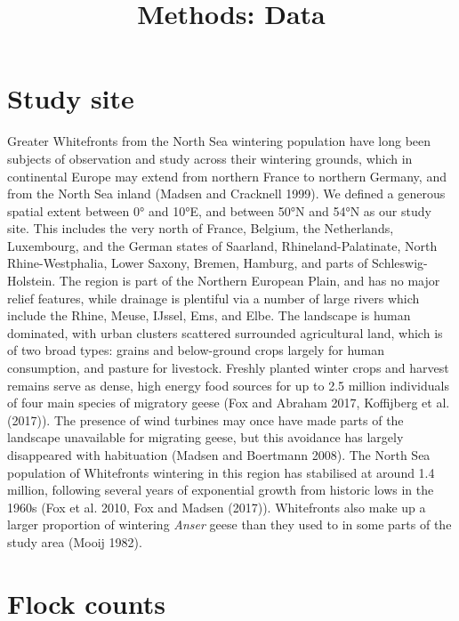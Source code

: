 \documentclass[twocolumn]{article}
\title{Methods: Data}
\date{}
\begin{document}
\maketitle

\section{Study site}\label{study-site}

Greater Whitefronts from the North Sea wintering population have long
been subjects of observation and study across their wintering grounds,
which in continental Europe may extend from northern France to northern
Germany, and from the North Sea inland (Madsen and Cracknell 1999). We
defined a generous spatial extent between 0° and 10°E, and between 50°N
and 54°N as our study site. This includes the very north of France,
Belgium, the Netherlands, Luxembourg, and the German states of Saarland,
Rhineland-Palatinate, North Rhine-Westphalia, Lower Saxony, Bremen,
Hamburg, and parts of Schleswig-Holstein. The region is part of the
Northern European Plain, and has no major relief features, while
drainage is plentiful via a number of large rivers which include the
Rhine, Meuse, IJssel, Ems, and Elbe. The landscape is human dominated,
with urban clusters scattered surrounded agricultural land, which is of
two broad types: grains and below-ground crops largely for human
consumption, and pasture for livestock. Freshly planted winter crops and
harvest remains serve as dense, high energy food sources for up to 2.5
million individuals of four main species of migratory geese (Fox and
Abraham 2017, Koffijberg et al. (2017)). The presence of wind turbines
may once have made parts of the landscape unavailable for migrating
geese, but this avoidance has largely disappeared with habituation
(Madsen and Boertmann 2008). The North Sea population of Whitefronts
wintering in this region has stabilised at around 1.4 million, following
several years of exponential growth from historic lows in the 1960s (Fox
et al. 2010, Fox and Madsen (2017)). Whitefronts also make up a larger
proportion of wintering \emph{Anser} geese than they used to in some
parts of the study area (Mooij 1982).

\section{Flock counts}\label{flock-counts}
\end{document}
